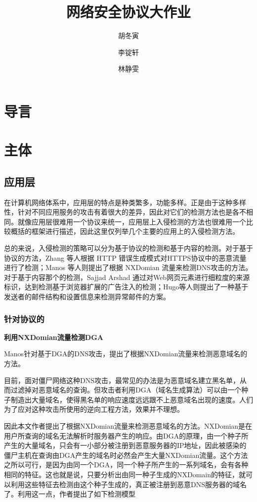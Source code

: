 \documentclass[12pt]{article} %
\title{网络安全协议大作业}
\author{胡冬寅 \and 李锭轩 \and 林静雯}
\date{} %
\begin{document}
\maketitle

\section{导言}

\section{主体}
\label{main}

\subsection{应用层}
\label{app}

在计算机网络体系中，应用层的特点是种类繁多，功能多样。正是由于这种多样性，针对不同应用服务的攻击有着很大的差异，因此对它们的检测方法也是各不相同。就像应用层很难用一个协议来统一，应用层上入侵检测的方法也很难用一个比较概括的框架进行描述，因此这里仅列举几个主要的应用上的入侵检测方法。

总的来说，入侵检测的策略可以分为基于协议的检测和基于内容的检测。对于基于协议的方法，Zhang 等人根据 HTTP 错误生成模式对HTTPS协议中的恶意流量进行了检测；Manos 等人则提出了根据 NXDomian 流量来检测DNS攻击的方法。对于基于内容那个的检测，Sajjad Arshad 通过对Web网页元素进行细粒度的来源标识，达到检测基于浏览器扩展的广告注入的检测；Hugo等人则提出了一种基于发送者的邮件结构和设置信息来检测异常邮件的方案。



\subsubsection{针对协议的}
\label{protocol}

\textbf{利用NXDomian流量检测DGA}


Manos针对基于DGA的DNS攻击，提出了根据NXDomian流量来检测恶意域名的方法。

目前，面对僵尸网络这种DNS攻击，最常见的办法是为恶意域名建立黑名单，从而过滤掉对恶意域名的查询。但攻击者利用DGA（域名生成算法）可以由一个种子制造出大量域名，使得黑名单的响应速度远远跟不上恶意域名出现的速度。人们为了应对这种攻击所使用的逆向工程方法，效果并不理想。

因此本文作者提出了根据NXDomian流量来检测恶意域名的方法。NXDomian是在用户所查询的域名无法解析时服务器产生的响应。由DGA的原理，由一个种子所产生的大量域名，只会有一小部分被注册到恶意服务器的IP地址，因此被感染的僵尸主机在查询由DGA产生的域名时必然会产生大量NXDomian流量。这个方法之所以可行，是因为由同一个DGA，同一个种子所产生的一系列域名，会有各种相同的特征。这也就是说，只要分析出由同一种子生成的NXDomain的特征，就可以利用这些特征去检测由这个种子生成的，真正被注册到恶意DNS服务器的域名了。利用这一点，作者提出了如下检测模型
\end{document}
